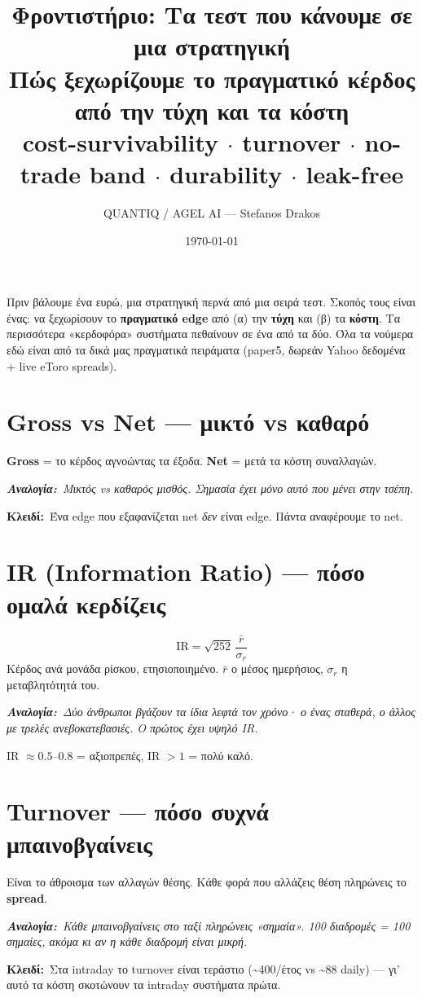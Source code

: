 \documentclass[11pt]{article}
\title{\textbf{Φροντιστήριο: Τα τεστ που κάνουμε σε μια στρατηγική}\\[3pt]
\large Πώς ξεχωρίζουμε το πραγματικό κέρδος από την τύχη και τα κόστη\\[-1pt]
\normalsize\textcolor{accent}{cost-survivability $\cdot$ turnover $\cdot$ no-trade band $\cdot$ durability $\cdot$ leak-free}}
\author{QUANTIQ / AGEL AI --- Stefanos Drakos}\date{\today}
\newcommand{\key}[1]{\par\medskip\noindent\colorbox{soft}{\parbox{\dimexpr\linewidth-2\fboxsep}{\textcolor{accent}{\textbf{Κλειδί:}}\ #1}}\par\medskip}
\newcommand{\analogy}[1]{\par\smallskip\noindent\textit{\textbf{Αναλογία:}\ #1}\par\smallskip}
\begin{document}
\maketitle\thispagestyle{empty}

\noindent Πριν βάλουμε ένα ευρώ, μια στρατηγική περνά από μια σειρά τεστ. Σκοπός τους είναι ένας:
να ξεχωρίσουν το \textbf{πραγματικό edge} από (α) την \textbf{τύχη} και (β) τα \textbf{κόστη}.
Τα περισσότερα «κερδοφόρα» συστήματα πεθαίνουν σε ένα από τα δύο. Όλα τα νούμερα εδώ είναι από τα
δικά μας πραγματικά πειράματα (paper5, δωρεάν Yahoo δεδομένα + live eToro spreads).

\tableofcontents
\bigskip

\section{Gross vs Net — μικτό vs καθαρό}
\textbf{Gross} = το κέρδος αγνοώντας τα έξοδα. \textbf{Net} = μετά τα κόστη συναλλαγών.
\analogy{Μικτός vs καθαρός μισθός. Σημασία έχει μόνο αυτό που μένει στην τσέπη.}
\key{Ένα edge που εξαφανίζεται net \emph{δεν} είναι edge. Πάντα αναφέρουμε το net.}

\section{IR (Information Ratio) — πόσο ομαλά κερδίζεις}
\[ \mathrm{IR}=\sqrt{252}\,\frac{\bar r}{\sigma_r} \]
Κέρδος ανά μονάδα ρίσκου, ετησιοποιημένο. $\bar r$ ο μέσος ημερήσιος, $\sigma_r$ η μεταβλητότητά του.
\analogy{Δύο άνθρωποι βγάζουν τα ίδια λεφτά τον χρόνο· ο ένας σταθερά, ο άλλος με τρελές ανεβοκατεβασιές.
Ο πρώτος έχει υψηλό IR.} IR $\approx 0.5$--$0.8$ = αξιοπρεπές, IR $>1$ = πολύ καλό.

\section{Turnover — πόσο συχνά μπαινοβγαίνεις}
Είναι το άθροισμα των αλλαγών θέσης. Κάθε φορά που αλλάζεις θέση πληρώνεις το \textbf{spread}.
\analogy{Κάθε μπαινοβγαίνεις στο ταξί πληρώνεις «σημαία». 100 διαδρομές = 100 σημαίες, ακόμα κι αν
η κάθε διαδρομή είναι μικρή.}
\key{Στα intraday το turnover είναι τεράστιο (\textasciitilde400/έτος vs \textasciitilde88 daily) — γι' αυτό τα κόστη
σκοτώνουν τα intraday συστήματα πρώτα.}
\end{document}
